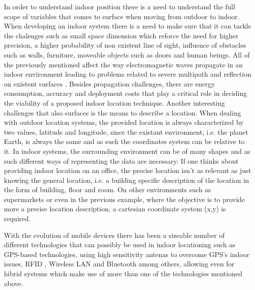 \documentclass[a4paper]{IEEEtran}
\begin{document}
In order to understand indoor position there is a need to understand the full scope of variables that comes to surface when moving from outdoor to indoor. When developing an indoor system there is a need to make sure that it can tackle the chalenges such as small space dimension which reforce the need for higher precision, a higher probability of non existent line of sight, influence of obstacles such as walls, furniture, moveable objects such as doors and human beings\cite{reviewtechniques, survey3}. All of the previously mentioned affect the way electromagnetic waves propagate in an indoor environment leading to problems related to severe multipath and reflection on existent surfaces \cite{surveywireless}. Besides propagation challenges, there are energy consumption, accuracy and deployment costs that play a critical role in deciding the viability of a proposed indoor location technique. Another interesting challenges that also surfaces is the means to describe a location. When dealing with outdoor location systems, the provided location is always characterized by two values, latitude and longitude, since the existant environment, i.e. the planet Earth, is always the same and as such the coordinates system can be relative to it. In indoor systems, the surrounding environment can be of many shapes and as such different ways of representing the data are necessary. If one thinks about providing indoor location on an office, the precise location isn't as relevant as just knowing the general location, i.e. a building specific description of the location in the form of building, floor and room. On other environments such as supermarkets or even in the previous example, where the objective is to provide more a precise location description, a cartesian coordinate system (x,y) is required.

With the evolution of mobile devices there has been a sizeable number of different technologies that can possibly be used in indoor locationing \cite{surveythesis,survey2} such as GPS-based technologies, using high sensitivity antenas to overcome GPS's indoor issues, RFID , Wireless LAN and Bluetooth among others, allowing even for hibrid systems which make use of more than one of the technologies mentioned above. 
\end{document}
